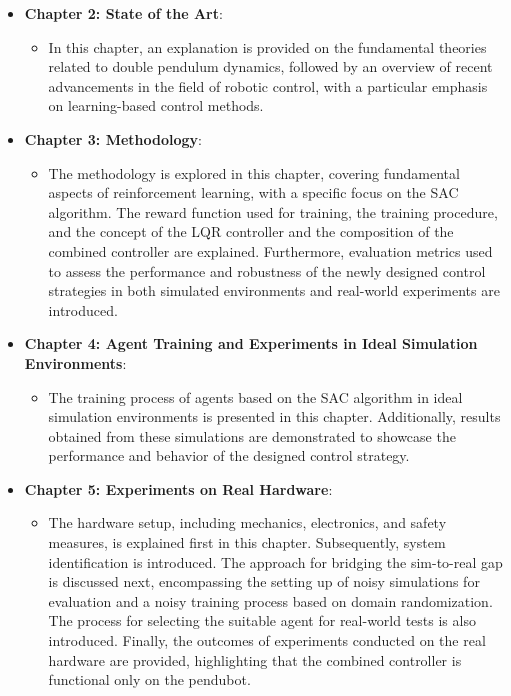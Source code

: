 \begin{itemize}
  \item \textbf{Chapter 2: State of the Art}:
    \begin{itemize}
      \item In this chapter, an explanation is provided on the fundamental theories related to double pendulum dynamics, followed by an overview of recent advancements in the field of robotic control, with a particular emphasis on learning-based control methods.
    \end{itemize}
  
  \item \textbf{Chapter 3: Methodology}:
    \begin{itemize}
      \item The methodology is explored in this chapter, covering fundamental aspects of reinforcement learning, with a specific focus on the SAC algorithm. The reward function used for training, the training procedure, and the concept of the LQR controller and the composition of the combined controller are explained. Furthermore, evaluation metrics used to assess the performance and robustness of the newly designed control strategies in both simulated environments and real-world experiments are introduced.
    \end{itemize}

  \item \textbf{Chapter 4: Agent Training and Experiments in Ideal Simulation Environments}:
    \begin{itemize}
      \item The training process of agents based on the SAC algorithm in ideal simulation environments is presented in this chapter. Additionally, results obtained from these simulations are demonstrated to showcase the performance and behavior of the designed control strategy.
    \end{itemize}
  
  \item \textbf{Chapter 5: Experiments on Real Hardware}:
    \begin{itemize}
      \item The hardware setup, including mechanics, electronics, and safety measures, is explained first in this chapter. Subsequently, system identification is introduced. The approach for bridging the sim-to-real gap is discussed next, encompassing the setting up of noisy simulations for evaluation and a noisy training process based on domain randomization. The process for selecting the suitable agent for real-world tests is also introduced. Finally, the outcomes of experiments conducted on the real hardware are provided, highlighting that the combined controller is functional only on the pendubot.
    \end{itemize}
  

\end{itemize}
